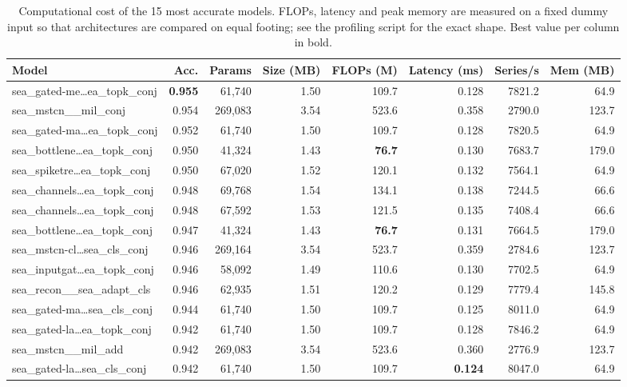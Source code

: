 \begin{table}[t]
\centering
\small
\caption{Computational cost of the 15 most accurate models. FLOPs, latency and peak memory are measured on a fixed dummy input so that architectures are compared on equal footing; see the profiling script for the exact shape. Best value per column in bold.}
\label{tab:efficiency}
\begin{tabular}{lrrrrrrr}
\toprule
Model & Acc. & Params & Size (MB) & FLOPs (M) & Latency (ms) & Series/s & Mem (MB) \\
\midrule
sea\_gated-me\dots{}ea\_topk\_conj & \textbf{0.955} & 61,740 & 1.50 & 109.7 & 0.128 & 7821.2 & 64.9 \\
sea\_mstcn\_\_mil\_conj & 0.954 & 269,083 & 3.54 & 523.6 & 0.358 & 2790.0 & 123.7 \\
sea\_gated-ma\dots{}ea\_topk\_conj & 0.952 & 61,740 & 1.50 & 109.7 & 0.128 & 7820.5 & 64.9 \\
sea\_bottlene\dots{}ea\_topk\_conj & 0.950 & 41,324 & 1.43 & \textbf{76.7} & 0.130 & 7683.7 & 179.0 \\
sea\_spiketre\dots{}ea\_topk\_conj & 0.950 & 67,020 & 1.52 & 120.1 & 0.132 & 7564.1 & 64.9 \\
sea\_channels\dots{}ea\_topk\_conj & 0.948 & 69,768 & 1.54 & 134.1 & 0.138 & 7244.5 & 66.6 \\
sea\_channels\dots{}ea\_topk\_conj & 0.948 & 67,592 & 1.53 & 121.5 & 0.135 & 7408.4 & 66.6 \\
sea\_bottlene\dots{}ea\_topk\_conj & 0.947 & 41,324 & 1.43 & \textbf{76.7} & 0.131 & 7664.5 & 179.0 \\
sea\_mstcn-cl\dots{}sea\_cls\_conj & 0.946 & 269,164 & 3.54 & 523.7 & 0.359 & 2784.6 & 123.7 \\
sea\_inputgat\dots{}ea\_topk\_conj & 0.946 & 58,092 & 1.49 & 110.6 & 0.130 & 7702.5 & 64.9 \\
sea\_recon\_\_sea\_adapt\_cls & 0.946 & 62,935 & 1.51 & 120.2 & 0.129 & 7779.4 & 145.8 \\
sea\_gated-ma\dots{}sea\_cls\_conj & 0.944 & 61,740 & 1.50 & 109.7 & 0.125 & 8011.0 & 64.9 \\
sea\_gated-la\dots{}ea\_topk\_conj & 0.942 & 61,740 & 1.50 & 109.7 & 0.128 & 7846.2 & 64.9 \\
sea\_mstcn\_\_mil\_add & 0.942 & 269,083 & 3.54 & 523.6 & 0.360 & 2776.9 & 123.7 \\
sea\_gated-la\dots{}sea\_cls\_conj & 0.942 & 61,740 & 1.50 & 109.7 & \textbf{0.124} & 8047.0 & 64.9 \\
\bottomrule
\end{tabular}
\end{table}
